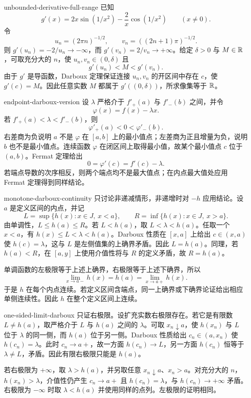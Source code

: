 \begin{solution}{unbounded-derivative-full-range}
已知
\[
 g'(x)=2x\sin(1/x^2)-\frac2x\cos(1/x^2)
 \qquad(x\ne0).
\]
令
\[
 u_n=(2\pi n)^{-1/2},
 \qquad
 v_n=((2n+1)\pi)^{-1/2}.
\]
则 \(g'(u_n)=-2/u_n\to-\infty\)，而 \(g'(v_n)=2/v_n\to+\infty\)。给定 \(\delta>0\) 与 \(M\in\mathbb{R}\)，可取充分大的 \(n\)，使 \(u_n,v_n\in(0,\delta)\) 且
\[
 g'(u_n)<M<g'(v_n).
\]
由于 \(g'\) 是导函数，Darboux 定理保证连接 \(u_n,v_n\) 的开区间中存在 \(c\)，使 \(g'(c)=M\)。因此任意实数 \(M\) 都属于 \(g'((0,\delta))\)，所求像集等于 \(\mathbb{R}\)。
\end{solution}

\begin{solution}{endpoint-darboux-version}
设 \(\lambda\) 严格介于 \(f'_+(a)\) 与 \(f'_-(b)\) 之间，并令
\[
 \varphi(x)=f(x)-\lambda x.
\]
若 \(f'_+(a)<\lambda<f'_-(b)\)，则
\[
 \varphi'_+(a)<0<\varphi'_-(b).
\]
右差商为负说明 \(a\) 不是 \(\varphi\) 在 \([a,b]\) 上的最小值点；左差商为正且增量为负，说明 \(b\) 也不是最小值点。连续函数 \(\varphi\) 在闭区间上取得最小值，故某个最小值点 \(c\) 位于 \((a,b)\)。Fermat 定理给出
\[
 0=\varphi'(c)=f'(c)-\lambda.
\]
若端点导数的次序相反，则两个端点均不是最大值点；在内点最大值处应用 Fermat 定理得到同样结论。
\end{solution}

\begin{solution}{monotone-darboux-continuity}
只讨论非递减情形，非递增时对 \(-h\) 应用结论。设 \(a\) 是定义区间的内点，并记
\[
 L=\sup\{h(x):x\in J,\ x<a\},
 \qquad
 R=\inf\{h(x):x\in J,\ x>a\}.
\]
由单调性，\(L\le h(a)\le R\)。若 \(L<h(a)\)，取 \(L<\lambda<h(a)\)。任取一个 \(x<a\)，有 \(h(x)\le L<\lambda<h(a)\)。Darboux 性质在 \([x,a]\) 上给出 \(c\in(x,a)\) 使 \(h(c)=\lambda\)，这与 \(L\) 是左侧值集的上确界矛盾。因此 \(L=h(a)\)。同理，若 \(h(a)<R\)，在 \([a,y]\) 上使用介值性将与 \(R\) 的定义矛盾，故 \(R=h(a)\)。

单调函数的左极限等于上述上确界，右极限等于上述下确界，所以
\[
 \lim_{x\to a-}h(x)=h(a)=\lim_{x\to a+}h(x).
\]
于是 \(h\) 在每个内点连续。若定义区间含端点，同一上确界或下确界论证给出相应单侧连续性。因此 \(h\) 在整个定义区间上连续。
\end{solution}

\begin{solution}{one-sided-limit-darboux}
只证右极限。设扩充实数右极限存在。若它是有限数 \(L\ne h(a)\)，取严格介于 \(L\) 与 \(h(a)\) 之间的 \(\lambda\)。可取 \(x_n\downarrow a\)，使 \(h(x_n)\) 与 \(L\) 位于 \(\lambda\) 的同一侧，而 \(h(a)\) 位于另一侧。Darboux 性质给出 \(c_n\in(a,x_n)\) 使 \(h(c_n)=\lambda\)。此时 \(c_n\to a+\)，故一方面 \(h(c_n)\to L\)，另一方面 \(h(c_n)\) 恒等于 \(\lambda\ne L\)，矛盾。因此有限右极限只能是 \(h(a)\)。

若右极限为 \(+\infty\)，取 \(\lambda>h(a)\)，并另取任意 \(x_n\downarrow a\)、\(x_n>a\)。对充分大的 \(n\)，\(h(x_n)>\lambda\)，介值性仍产生 \(c_n\to a+\) 且 \(h(c_n)=\lambda\)，与 \(h(c_n)\to+\infty\) 矛盾。右极限为 \(-\infty\) 时取 \(\lambda<h(a)\) 并使用同样的点列。左极限的证明相同。
\end{solution}

